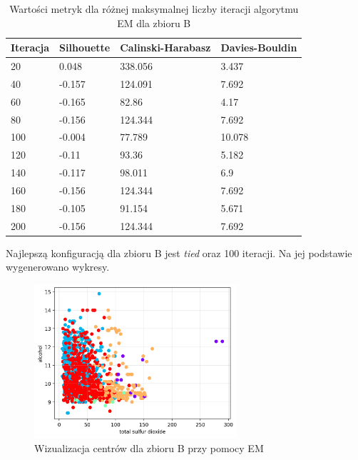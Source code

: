 \documentclass[a4paper,11pt]{article}
\begin{document}
\begin{table}[H]
    \centering
    \begin{tabular}{|l|l|l|l|}
    \hline
    \textbf{Iteracja} & \textbf{Silhouette} & \textbf{Calinski-Harabasz} & \textbf{Davies-Bouldin} \\ \hline
    20                & 0.048               & 338.056                    & 3.437                   \\ \hline
    40                & -0.157              & 124.091                    & 7.692                   \\ \hline
    60                & -0.165              & 82.86                      & 4.17                    \\ \hline
    80                & -0.156              & 124.344                    & 7.692                   \\ \hline
    100               & -0.004              & 77.789                     & 10.078                  \\ \hline
    120               & -0.11               & 93.36                      & 5.182                   \\ \hline
    140               & -0.117              & 98.011                     & 6.9                     \\ \hline
    160               & -0.156              & 124.344                    & 7.692                   \\ \hline
    180               & -0.105              & 91.154                     & 5.671                   \\ \hline
    200               & -0.156              & 124.344                    & 7.692                   \\ \hline
    \end{tabular}
    \caption{Wartości metryk dla różnej maksymalnej liczby iteracji algorytmu EM dla zbioru B}
    \label{tab:em_b_iter}
\end{table}

Najlepszą konfiguracją dla zbioru B jest \textit{tied} oraz 100 iteracji. Na jej podstawie wygenerowano wykresy.

\begin{figure}[H]
    \centering
    \includegraphics[width=0.67\textwidth]{images2/EM/wines/ExpectationMaximization_Wines_xtotalsulfurdioxide_yalcohol.png}
    \caption{Wizualizacja centrów dla zbioru B przy pomocy EM}
    \label{fig:em_b_1}
\end{figure}
\end{document}

